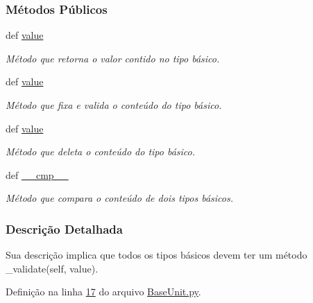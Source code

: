 \subsubsection*{Métodos Públicos}
\begin{DoxyCompactItemize}
\item 
def \hyperlink{classELO_1_1BaseUnit_1_1IfBaseType_ae4974528321f9314afd17c3da0e9d676}{value}
\begin{DoxyCompactList}\small\item\em Método que retorna o valor contido no tipo básico. \end{DoxyCompactList}\item 
def \hyperlink{classELO_1_1BaseUnit_1_1IfBaseType_ae4974528321f9314afd17c3da0e9d676}{value}
\begin{DoxyCompactList}\small\item\em Método que fixa e valida o conteúdo do tipo básico. \end{DoxyCompactList}\item 
def \hyperlink{classELO_1_1BaseUnit_1_1IfBaseType_ae4974528321f9314afd17c3da0e9d676}{value}
\begin{DoxyCompactList}\small\item\em Método que deleta o conteúdo do tipo básico. \end{DoxyCompactList}\item 
def \hyperlink{classELO_1_1BaseUnit_1_1IfBaseType_a69c338f6f1574bd3524e9d59ebc17a7c}{\-\_\-\-\_\-cmp\-\_\-\-\_\-}
\begin{DoxyCompactList}\small\item\em Método que compara o conteúdo de dois tipos básicos. \end{DoxyCompactList}\end{DoxyCompactItemize}


\subsubsection{Descrição Detalhada}
Sua descrição implica que todos os tipos básicos devem ter um método \-\_\-validate(self, value). 

Definição na linha \hyperlink{BaseUnit_8py_source_l00017}{17} do arquivo \hyperlink{BaseUnit_8py_source}{Base\-Unit.\-py}.




